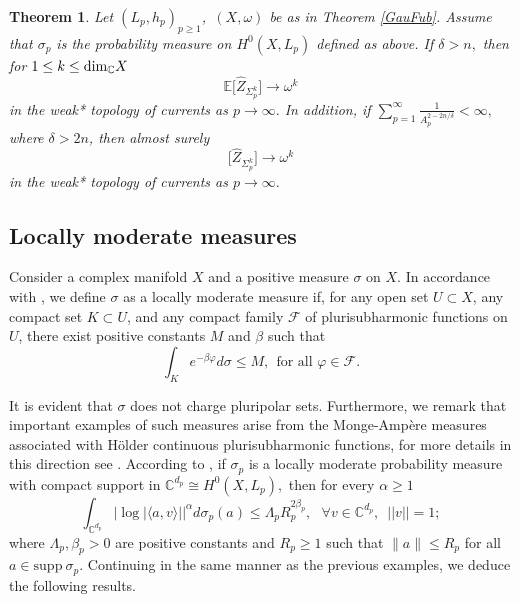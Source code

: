 \documentclass[11pt,leqno,oneside]{amsart}
\newtheorem{thm}{Theorem}[section]
\numberwithin{equation}{section}
\begin{document}
\begin{thm} \label{decay} Let $(L_{p}, h_{p})_{p\geq 1}$,\, $(X, \omega)$ be as in Theorem \ref{GauFub}. Assume that $\sigma_{p}$ is the probability measure on $H^{0}(X, L_{p})$ defined as above. If $\delta>n,$ then for $1\leq k \leq \textup{dim}_{\mathbb{C}} X$
	\begin{equation}
		\mathbb{E}\big[\widehat{Z}_{\Sigma_{p}^{k}}\big]\longrightarrow \omega^k
	\end{equation}
	in the weak* topology of currents as $p\rightarrow \infty.$ In addition, if $\sum_{p=1}^{\infty}\frac{1}{A_{p}^{2-2n/\delta}}< \infty,$ where $\delta > 2n$,  then almost surely
	\begin{equation}
		\big[\widehat{Z}_{\Sigma_{p}^{k}}\big]\longrightarrow \omega^k
	\end{equation}
	in the weak* topology of currents as $p \rightarrow \infty.$
\end{thm}


\subsection{Locally moderate measures}

Consider a complex manifold $X$ and a positive measure $\sigma$ on $X$. In accordance with \cite{DNS}, we define $\sigma$ as a locally moderate measure if, for any open set $U \subset X$, any compact set $K \subset U$, and any compact family $\mathscr{F}$ of plurisubharmonic functions on $U$, there exist positive constants $M$ and $\beta$ such that
\begin{equation}
	\int_{K}e^{-\beta \varphi }d\sigma \leq M, \ \ \text{for all } \varphi \in \mathscr{F}.
\end{equation}

It is evident that $\sigma$ does not charge pluripolar sets. Furthermore, we remark that important examples of such measures arise from the Monge-Ampère measures associated with Hölder continuous plurisubharmonic functions, for more details in this direction see \cite{DNS}. According to \cite[Lemma 4.16]{BCM}, if $\sigma_{p}$ is a locally moderate probability measure with compact support in $\mathbb{C}^{d_{p}}\cong H^{0}(X,L_{p}),$ then for every $\alpha\geq 1$
 \begin{equation}\int_{\mathbb{C}^{d_{p}}}{|\log{|\langle a, v \rangle|}|}^{\alpha}d\sigma_{p}(a)\leq \Lambda_{p} R_{p}^{2\beta_{p}}, \,\,\,\,\forall v\in \mathbb{C}^{d_{p}},\,\,\,||v||=1;\end{equation}
where $\Lambda_{p}, \beta_{p}>0$ are positive constants and $R_{p}\geq 1$ such that $\|a\|\leq R_{p} $ for all $a\in \mathrm{supp} \ \sigma_{p}.$ Continuing in the same manner as the previous examples, we deduce the following results.
\end{document}
